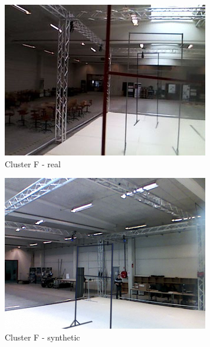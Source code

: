 \begin{figure}[h!]
   \begin{subfigure}{0.29\textwidth}
      \includegraphics[width=\textwidth]{figure/tsne_random/F/1.png}
      \caption{Cluster F - real}
   \end{subfigure}
   \begin{subfigure}{0.29\textwidth}
      \includegraphics[width=\textwidth]{figure/tsne_random/F/9.png}
      \caption{Cluster F - synthetic}
   \end{subfigure}
   \begin{subfigure}{0.29\textwidth}

\end{subfigure}
\end{figure}
